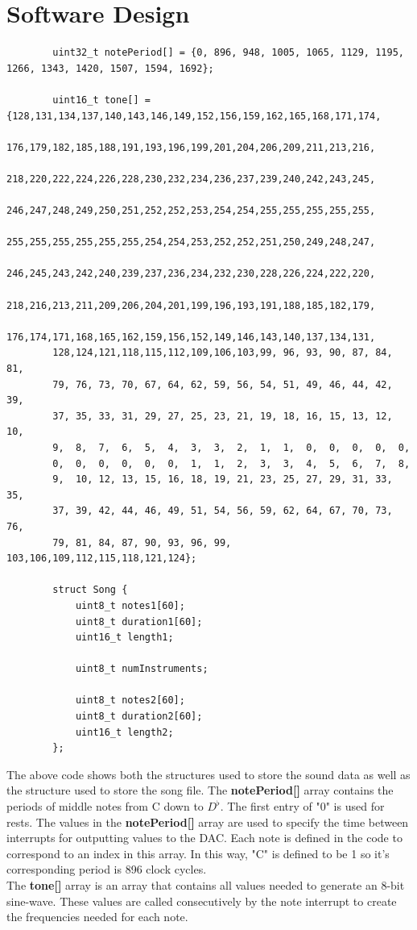 \documentclass{article}
\begin{document}
\section{Software Design}
	\begin{lstlisting}
		uint32_t notePeriod[] = {0, 896, 948, 1005, 1065, 1129, 1195, 1266, 1343, 1420, 1507, 1594, 1692};		
		
		uint16_t tone[] = {128,131,134,137,140,143,146,149,152,156,159,162,165,168,171,174,
  		176,179,182,185,188,191,193,196,199,201,204,206,209,211,213,216,
  		218,220,222,224,226,228,230,232,234,236,237,239,240,242,243,245,
  		246,247,248,249,250,251,252,252,253,254,254,255,255,255,255,255,
  		255,255,255,255,255,255,254,254,253,252,252,251,250,249,248,247,
  		246,245,243,242,240,239,237,236,234,232,230,228,226,224,222,220,
  		218,216,213,211,209,206,204,201,199,196,193,191,188,185,182,179,
  		176,174,171,168,165,162,159,156,152,149,146,143,140,137,134,131,
  		128,124,121,118,115,112,109,106,103,99, 96, 93, 90, 87, 84, 81, 
  		79, 76, 73, 70, 67, 64, 62, 59, 56, 54, 51, 49, 46, 44, 42, 39, 
  		37, 35, 33, 31, 29, 27, 25, 23, 21, 19, 18, 16, 15, 13, 12, 10, 
  		9,  8,  7,  6,  5,  4,  3,  3,  2,  1,  1,  0,  0,  0,  0,  0,  
  		0,  0,  0,  0,  0,  0,  1,  1,  2,  3,  3,  4,  5,  6,  7,  8,  
  		9,  10, 12, 13, 15, 16, 18, 19, 21, 23, 25, 27, 29, 31, 33, 35, 
  		37, 39, 42, 44, 46, 49, 51, 54, 56, 59, 62, 64, 67, 70, 73, 76, 
  		79, 81, 84, 87, 90, 93, 96, 99, 103,106,109,112,115,118,121,124};
  				
		struct Song {
			uint8_t notes1[60];
			uint8_t duration1[60];
			uint16_t length1;
			
			uint8_t numInstruments;
	
			uint8_t notes2[60];
			uint8_t duration2[60];
			uint16_t length2;
		};
	\end{lstlisting}
	The above code shows both the structures used to store the sound data as well as the structure used to store the song file. The \textbf{notePeriod[]} array contains the periods of middle notes from C down to $D^{\flat}$. The first entry of "0" is used for rests. The values in the \textbf{notePeriod[]} array are used to specify the time between interrupts for outputting values to the DAC. Each note is defined in the code to correspond to an index in this array. In this way, "C" is defined to be 1 so it's corresponding period is 896 clock cycles.\\
	The \textbf{tone[]} array is an array that contains all values needed to generate an 8-bit sine-wave. These values are called consecutively by the note interrupt to create the frequencies needed for each note.\\
\end{document}

